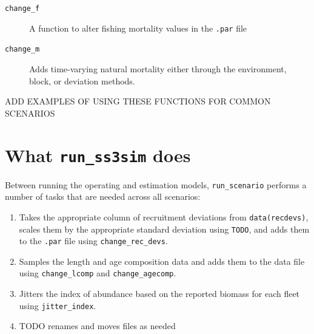 \documentclass[12pt]{article}
\begin{document}
\begin{description}
  \item[\texttt{change\_f}] A function to alter fishing mortality values in the \texttt{.par} file

  \item[\texttt{change\_m}] Adds time-varying natural mortality either through the environment, block, or deviation methods.
\end{description}

ADD EXAMPLES OF USING THESE FUNCTIONS FOR COMMON SCENARIOS

\section*{What \texttt{run\_ss3sim} does}

Between running the operating and estimation models, \texttt{run\_scenario} performs a number of tasks that are needed across all scenarios:

\begin{enumerate}
  \item Takes the appropriate column of recruitment deviations from \texttt{data(recdevs)}, scales them by the appropriate standard deviation using \texttt{TODO}, and adds them to the \texttt{.par} file using \texttt{change\_rec\_devs}. \item Samples the length and age composition data and adds them to the data file using \texttt{change\_lcomp} and \texttt{change\_agecomp}.
  \item Jitters the index of abundance based on the reported biomass for each fleet using \texttt{jitter\_index}.
  \item TODO renames and moves files as needed
\end{enumerate}
\end{document}
